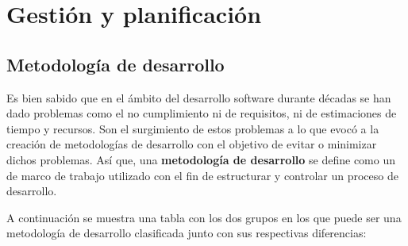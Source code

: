 \chapter{Gestión y planificación}

\section{Metodología de desarrollo}
Es bien sabido que en el ámbito del desarrollo software durante décadas se han dado problemas como el no cumplimiento ni de requisitos, ni de estimaciones de tiempo y recursos. Son el surgimiento de estos problemas a lo que evocó a la creación de metodologías de desarrollo con el objetivo de evitar o minimizar dichos problemas. Así que, una \textbf{metodología de desarrollo} se define como un de marco de trabajo utilizado con el fin de estructurar y controlar un proceso de desarrollo. \bigskip

A continuación se muestra una tabla con los dos grupos en los que puede ser una metodología de desarrollo clasificada junto con sus respectivas diferencias:

